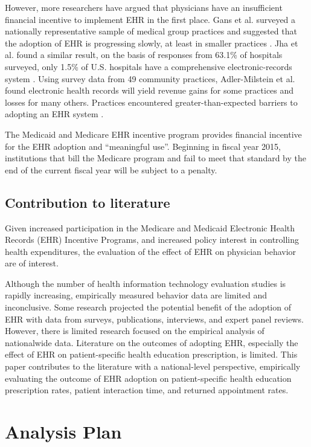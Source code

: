 \documentclass[12pt]{report}
\begin{document}
However, more researchers have argued that physicians have an insufficient financial incentive to implement EHR in the first place. Gans et al. surveyed a nationally representative sample of medical group practices and suggested that the adoption of EHR is progressing slowly, at least in smaller practices \citep{Gans2005}. Jha et al. found a similar result, on the basis of responses from 63.1\% of hospitals surveyed, only 1.5\% of U.S. hospitals have a comprehensive electronic-records system \citep{Jha2009}. Using survey data from 49 community practices, Adler-Milstein et al. found electronic health records will yield revenue gains for some practices and losses for many others. Practices encountered greater-than-expected barriers to adopting an EHR system \citep{Adler-Milstein2012}.

The Medicaid and Medicare EHR incentive program provides financial incentive for the EHR adoption and ``meaningful use''. Beginning in fiscal year 2015, institutions that bill the Medicare program and fail to meet that standard by the end of the current fiscal year will be subject to a penalty. 

\section{Contribution to literature}

Given increased participation in the Medicare and Medicaid Electronic Health Records (EHR) Incentive Programs, and increased policy interest in controlling health expenditures, the evaluation of the effect of EHR on physician behavior are of interest.

Although the number of health information technology evaluation studies is rapidly increasing, empirically measured behavior data are limited and inconclusive. Some research projected the potential benefit of the adoption of EHR with data from surveys, publications, interviews, and expert panel reviews. However, there is limited research focused on the empirical analysis of nationalwide data. Literature on the outcomes of adopting EHR, especially the effect of EHR on patient-specific health education prescription, is limited. This paper contributes to the literature with a national-level perspective, empirically evaluating the outcome of EHR adoption on patient-specific health education prescription rates, patient interaction time, and returned appointment rates.

\chapter{Analysis Plan}
\label{chapter:analysisplan}
\end{document}

